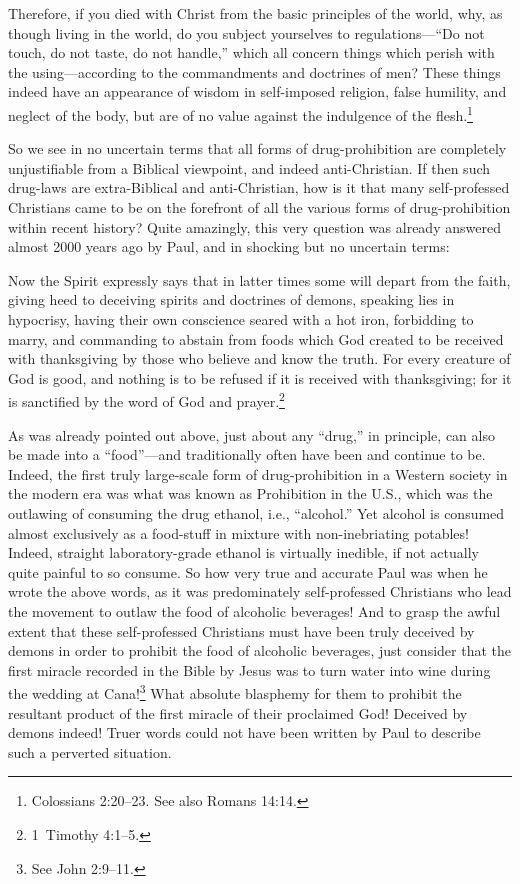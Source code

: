 \documentclass[letterpaper,12pt]{article}
\newenvironment{squote}
  {\small\quote}
  {\endquote\normalsize}
\begin{document}
\begin{squote}
Therefore, if you died with Christ from the basic principles of the world, why, as though living in the world, do you subject yourselves to regulations---``Do not touch, do not taste, do not handle,'' which all concern things which perish with the using---according to the commandments and doctrines of men? These things indeed have an appearance of wisdom in self-imposed religion, false humility, and neglect of the body, but are of no value against the indulgence of the flesh.\footnote{Colossians 2:20--23. See also Romans 14:14.}
\end{squote}

So we see in no uncertain terms that all forms of drug-prohibition are completely unjustifiable from a Biblical viewpoint, and indeed anti-Christian. If then such drug-laws are extra-Biblical and anti-Christian, how is it that many self-professed Christians came to be on the forefront of all the various forms of drug-prohibition within recent history? Quite amazingly, this very question was already answered almost 2000 years ago by Paul, and in shocking but no uncertain terms:

\begin{squote}
Now the Spirit expressly says that in latter times some will depart from the faith, giving heed to deceiving spirits and doctrines of demons, speaking lies in hypocrisy, having their own conscience seared with a hot iron, forbidding to marry, and commanding to abstain from foods which God created to be received with thanksgiving by those who believe and know the truth. For every creature of God is good, and nothing is to be refused if it is received with thanksgiving; for it is sanctified by the word of God and prayer.\footnote{1~Timothy 4:1--5.}
\end{squote}

As was already pointed out above, just about any ``drug,'' in principle, can also be made into a ``food''---and traditionally often have been and continue to be. Indeed, the first truly large-scale form of drug-prohibition in a Western society in the modern era was what was known as Prohibition in the U.S., which was the outlawing of consuming the drug ethanol, i.e., ``alcohol.'' Yet alcohol is consumed almost exclusively as a food-stuff in mixture with non-inebriating potables! Indeed, straight laboratory-grade ethanol is virtually inedible, if not actually quite painful to so consume. So how very true and accurate Paul was when he wrote the above words, as it was predominately self-professed Christians who lead the movement to outlaw the food of alcoholic beverages! And to grasp the awful extent that these self-professed Christians must have been truly deceived by demons in order to prohibit the food of alcoholic beverages, just consider that the first miracle recorded in the Bible by Jesus was to turn water into wine during the wedding at Cana!\footnote{See John 2:9--11.} What absolute blasphemy for them to prohibit the resultant product of the first miracle of their proclaimed God! Deceived by demons indeed! Truer words could not have been written by Paul to describe such a perverted situation.
\end{document}
